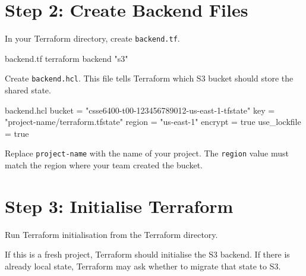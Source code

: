 \documentclass{csse4400}
\begin{document}



\section{Step 2: Create Backend Files}

In your Terraform directory, create \texttt{backend.tf}.
%
\begin{code}[language=terraform,numbers=none]{backend.tf}
terraform {
  backend "s3" {}
}
\end{code}

\noindent
Create \texttt{backend.hcl}.
This file tells Terraform which S3 bucket should store the shared state.
%
\begin{code}[language=terraform,numbers=none]{backend.hcl}
bucket       = "csse6400-t00-123456789012-us-east-1-tfstate"
key          = "project-name/terraform.tfstate"
region       = "us-east-1"
encrypt      = true
use_lockfile = true
\end{code}

\noindent
Replace \texttt{project-name} with the name of your project.
The \texttt{region} value must match the region where your team created the bucket.




\section{Step 3: Initialise Terraform}

Run Terraform initialisation from the Terraform directory.


\noindent
If this is a fresh project, Terraform should initialise the S3 backend.
If there is already local state, Terraform may ask whether to migrate that state to S3.
\end{document}
